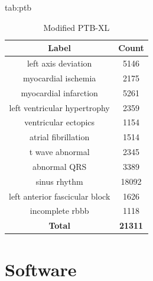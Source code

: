 \documentclass[pmlr,twocolumn]{jmlr}%
\begin{document}
\begin{table}[tbp]
\floatconts
  {tab:ptb}%
  {\caption{Modified PTB-XL}}%
  {
    \begin{tabular}{|c|c|}
     \hline
    Label & Count \\
     \hline
        left axis deviation                  &   5146 \\
        myocardial ischemia                  &   2175 \\
        myocardial infarction                &   5261 \\
        left ventricular hypertrophy         &   2359 \\
        ventricular ectopics                 &   1154 \\
        atrial fibrillation                  &   1514 \\
        t wave abnormal                      &   2345 \\
        abnormal QRS                         &   3389 \\
        sinus rhythm                         &  18092 \\
        left anterior fascicular block       &   1626 \\
        incomplete rbbb &   1118 \\
     \hline
    \textbf{Total} & \textbf{21311}\\
    \hline
    \end{tabular}
  }
\end{table}



\section{Software}
\label{sec:software}
\end{document}
